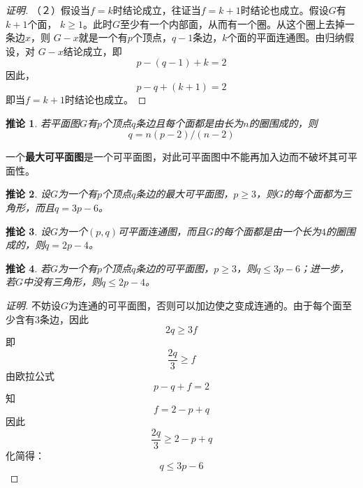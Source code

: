 \documentclass{book}[oneside]
\newtheorem{Cor}{推论}[chapter]
\begin{document}
\begin{CJK*}{UTF8}{gbsn}
\begin{proof}[证明]
  （２）假设当$f=k$时结论成立，往证当$f=k+1$时结论也成立。假设$G$有$k+1$个面，
  $k\geq 1$。此时$G$至少有一个内部面，从而有一个圈。从这个圈上去掉一条边$x$，则
  $G-x$就是一个有$p$个顶点，$q-1$条边，$k$个面的平面连通图。由归纳假设，对
  $G-x$结论成立，即\[p-(q-1) + k =2\]
  因此，\[p-q+ (k+1) =2\]
  即当$f=k+1$时结论也成立。
\end{proof}
 \begin{Cor}
    若平面图$G$有$p$个顶点$q$条边且每个面都是由长为$n$的圈围成的，则
    \begin{equation*}
      q = n(p-2)/(n-2)
    \end{equation*}
  \end{Cor}
一个{\bfseries 最大可平面图}是一个可平面图，对此可平面图中不能再加入边而不破坏其可平面性。
  \begin{Cor}
    设$G$为一个有$p$个顶点$q$条边的最大可平面图，$p \geq 3$，则$G$的每个面都为三角形，而且$q=3p-6$。
  \end{Cor}
  \begin{Cor}
    设$G$为一个$(p,q)$可平面连通图，而且$G$的每个面都是由一个长为$4$的圈围成的，则$q=2p-4$。
  \end{Cor}
  \begin{Cor}
    若$G$为一个有$p$个顶点$q$条边的可平面图，$p\geq 3$，则$q \leq 3p - 6$；进一步，若$G$中没有三角形，则$q \leq 2p -4$。
  \end{Cor}
     \centering
 \begin{proof}[证明]
  不妨设$G$为连通的可平面图，否则可以加边使之变成连通的。由于每个面至少含有3条边，因此
  \[2q \geq 3f\]
  即
  \[\frac{2q}{3} \geq f\]
  由欧拉公式
  \[p - q + f = 2\]
  知
  \[f=2-p+q\]
  因此
  \[\frac{2q}{3} \geq 2-p+q\]
  化简得：
  \[q \leq 3p - 6\]


\end{proof}
\end{CJK*}
\end{document}
